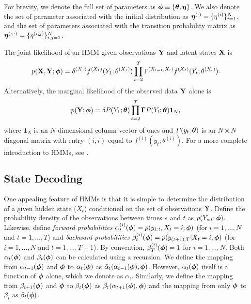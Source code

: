 For brevity, we denote the full set of parameters as $\boldsymbol{\phi} \equiv \{\boldsymbol{\theta},\boldsymbol{\eta}\}$. We also denote the set of parameter associated with the initial distribution as $\boldsymbol{\eta}^{(\cdot)} = \{\eta^{(i)}\}_{i=1}^N$, and the set of parameters associated with the transition probability matrix as $\boldsymbol{\eta}^{(\cdot,\cdot)} = \{\eta^{(i,j)}\}_{i,j=1}^N$. 

The joint likelihood of an HMM given observations $\mathbf{Y}$ and latent states $\mathbf{X}$ is
%
\begin{equation}
    p(\mathbf{X},\mathbf{Y};\boldsymbol{\phi}) = \delta^{(X_1)} f^{(X_1)}(Y_1; \theta^{(X_1)}) \prod_{t=2}^T \Gamma^{(X_{t-1},X_t)} f^{(X_t)}(Y_t; \theta^{(X_t)}).
    \label{eqn:like}
\end{equation}
%
Alternatively, the marginal likelihood of the observed data $\mathbf{Y}$ alone is 
%
\begin{equation}
    p(\mathbf{Y};\boldsymbol{\phi}) = \delta P(Y_1;\boldsymbol{\theta}) \prod_{t=2}^T \boldsymbol{\Gamma} P(Y_t;\boldsymbol{\theta}) \mathbf{1}_N,
    \label{eqn:like_marginal}
\end{equation}
%
where $\mathbf{1}_N$ is an $N$-dimensional column vector of ones and $P(y_t;\boldsymbol{\theta})$ is an $N \times N$ diagonal matrix with entry $(i,i)$ equal to $f^{(i)}(y_t; \theta^{(i)})$. For a more complete introduction to HMMs, see \citet{Zucchini:2016}.
%
\subsection{State Decoding}
%
%
%
%
%
%
%
%
One appealing feature of HMMs is that it is simple to determine the distribution of a given hidden state ($X_t$) conditioned on the set of observations $\mathbf{Y}$. Define the probability density of the observations between times $s$ and $t$ as $p(Y_{s:t};\boldsymbol{\phi})$. Likewise, define \textit{forward probabilities} $\alpha^{(i)}_t(\boldsymbol{\phi}) = p(y_{1:t},X_t = i;\boldsymbol{\phi})$ (for $i = 1,\ldots,N$ and $t = 1,\ldots,T$) and \textit{backward probabilities} $\beta^{(i)}_t(\boldsymbol{\phi}) = p(y_{(t+1):T}|X_t = i;\boldsymbol{\phi})$ (for $i = 1,\ldots,N$ and $t = 1,\ldots,T-1$). By convention, $\beta^{(i)}_T(\boldsymbol{\phi}) = 1$ for $i = 1,\ldots,N$. Both $\alpha_t(\boldsymbol{\phi})$ and $\beta_t(\boldsymbol{\phi})$ can be calculated using a recursion. We define the mapping from $\alpha_{t-1}(\boldsymbol{\phi})$ and $\boldsymbol{\phi}$ to $\alpha_t(\boldsymbol{\phi})$ as $\tilde \alpha_t(\alpha_{t-1}(\boldsymbol{\phi}),\boldsymbol{\phi})$. However, $\alpha_t(\boldsymbol{\phi})$ itself is a function of $\boldsymbol{\phi}$ alone, which we denote as $\alpha_t$. Similarly, we define the mapping from $\beta_{t+1}(\boldsymbol{\phi})$ and $\boldsymbol{\phi}$ to $\beta_{t}(\boldsymbol{\phi})$ as $\tilde \beta_t(\alpha_{t+1}(\boldsymbol{\phi}),\boldsymbol{\phi})$ and the mapping from only $\boldsymbol{\phi}$ to $\beta_t$ as $\beta_t(\boldsymbol{\phi})$. 

